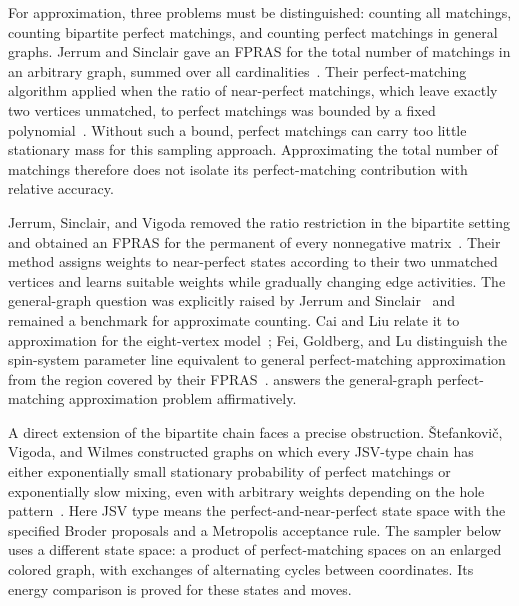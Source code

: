 \documentclass[11pt]{article}
\theoremstyle{definition}
\theoremstyle{remark}
\numberwithin{equation}{section}
\begin{document}
For approximation, three problems must be distinguished: counting all
matchings, counting bipartite perfect matchings, and counting perfect
matchings in general graphs. Jerrum and Sinclair gave an FPRAS for the
total number of matchings in an arbitrary graph, summed over all
cardinalities~\cite[Corollary~4.5]{JerrumSinclair1989}.
Their perfect-matching algorithm applied when the ratio of near-perfect
matchings, which leave exactly two vertices unmatched, to perfect
matchings was bounded by a fixed polynomial~\cite[Theorem~5.3]{JerrumSinclair1989}.
Without such a bound, perfect matchings can carry too little stationary
mass for this sampling approach. Approximating the total number of
matchings therefore does not isolate its perfect-matching contribution
with relative accuracy.

Jerrum, Sinclair, and Vigoda removed the ratio restriction in the
bipartite setting and obtained an FPRAS for the permanent of every
nonnegative matrix~\cite[Theorem~1.1]{JerrumSinclairVigoda2004}.
Their method assigns weights to near-perfect states according to their
two unmatched vertices and learns suitable weights while gradually
changing edge activities. The general-graph question was explicitly
raised by Jerrum and Sinclair~\cite[Section~7(i)]{JerrumSinclair1989}
and remained a benchmark for approximate counting. Cai and Liu relate
it to approximation for the eight-vertex model~\cite{CaiLiu2020};
Fei, Goldberg, and Lu distinguish the spin-system parameter line
equivalent to general perfect-matching approximation from the region
covered by their FPRAS~\cite[Proposition~1.2 and Theorem~1.5]{FeiGoldbergLu2025}.
 answers the general-graph perfect-matching approximation
problem affirmatively.

A direct extension of the bipartite chain faces a precise obstruction.
\v{S}tefankovi\v{c}, Vigoda, and Wilmes constructed graphs on which every
JSV-type chain has either exponentially small stationary probability
of perfect matchings or exponentially slow mixing, even with arbitrary
weights depending on the hole pattern~\cite[Definition~2.1 and
Theorem~2.2 in the full version]{StefankovicVigodaWilmes2018}.
Here JSV type means the perfect-and-near-perfect state space with the
specified Broder proposals and a Metropolis acceptance rule. The
sampler below uses a different state space: a product of
perfect-matching spaces on an enlarged colored graph, with exchanges
of alternating cycles between coordinates. Its energy comparison is
proved for these states and moves.
\end{document}
